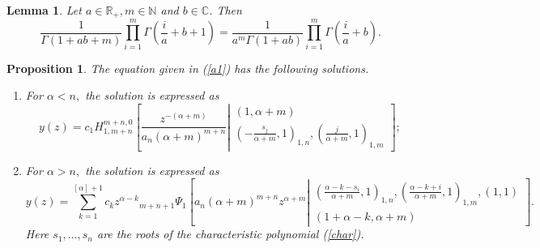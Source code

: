 \documentclass[10pt,a4paper]{amsart}
\newtheorem{lemma}{Lemma}
\newtheorem{proposition}{Proposition}
\begin{document}
\begin{lemma}\label{lem1}
Let $a\in\mathbb{R}_{+}, m\in \mathbb{N}$ and $b\in\mathbb{C}$. Then
\begin{equation}\label{lemeq}
    \frac{1}{\Gamma(1+ab+m)}\prod_{i=1}^{m}\Gamma\left(\frac{i}{a}+b+1\right)=\frac{1}{a^m\Gamma(1+ab)}\prod_{i=1}^m\Gamma\left(\frac{i}{a}+b\right).
\end{equation}
\end{lemma}

\begin{proposition}\label{thm1}
The equation given in (\ref{a1}) has the following solutions.
\begin{enumerate}
    \item For $\alpha<n,$ the solution is expressed as
    \begin{equation}\label{uuu2}
    y(z)=c_1H_{1,m+n}^{m+n,0} \left[ \frac{z^{-(\alpha+m)}}{a_n(\alpha+m)^{m+n}} \left| \begin{matrix}
( 1 , \alpha+m )  \\
\left( -\frac{s_j}{\alpha+m} , 1 \right)_{1,n}, \left(\frac{j}{\alpha+m} , 1  \right)_{1,m}   \end{matrix}\right.\right];  
    \end{equation}
    \item For $\alpha>n,$ the solution is expressed as
    \begin{equation}\label{uuu3}
        y(z)=\sum_{k=1}^{[\alpha]+1} c_kz^{\alpha-k} {}_{m+n+1}\Psi_1 \left[a_{n}(\alpha+m)^{m+n}z^{\alpha+m}\left|\begin{matrix}\left( \frac{\alpha-k-s_i}{\alpha+m} , 1 \right)_{1,n}, \left(\frac{\alpha-k+i}{\alpha+m},1\right)_{1,m} , ( 1 , 1 )\\ 
( 1+\alpha-k , \alpha+m )  \end{matrix}\right.\right].
    \end{equation}
Here  $s_1,\dots,s_n$ are the roots of the characteristic polynomial (\ref{char}). 
\end{enumerate}
\end{proposition}
\end{document}
